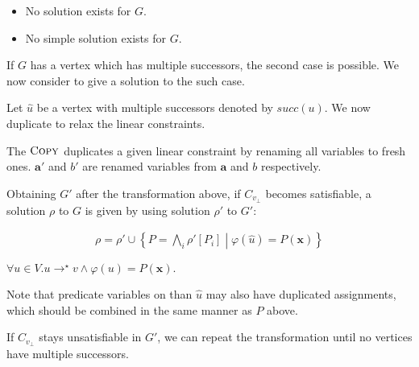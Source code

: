 \documentclass[a4paper,12pt]{article}
\newcommand{\path}[2]{#1\rightarrow^\star#2}
\begin{document}
\begin{itemize}
\item No solution exists for $G$.
\item No simple solution exists for $G$.
\end{itemize}

If $G$ has a vertex which has multiple successors, the second case is
possible. We now consider to give a solution to the such case.

Let $\hat u$ be a vertex with multiple successors denoted by
$succ(u)$. We now duplicate to relax the linear constraints.





The $\textsc{Copy}$ duplicates a given linear constraint by renaming
all variables to fresh ones. $\mathbf{a'}$ and $b'$ are renamed
variables from $\mathbf{a}$ and $b$ respectively.

Obtaining $G'$ after the transformation above, if $C_{v_\bot}$ becomes
satisfiable, a solution $\rho$ to $G$ is given by using solution
$\rho'$ to $G'$:

\begin{align*}
 \rho = \rho' \cup \left\lbrace P = \bigwedge_i \rho'[P_i] \middle|
 \varphi(\hat u) = P(\mathbf{x}) \right\rbrace
\end{align*}

$\forall u \in V. \path{u}{v} \wedge \varphi(u) = P(\mathbf{x}).
$

Note that predicate variables on  than $\hat u$ may
also have duplicated assignments, which should be combined in the
same manner as $P$ above.

If $C_{v_\bot}$ stays unsatisfiable in $G'$, we can repeat the
transformation until no vertices have multiple successors.
\end{document}
